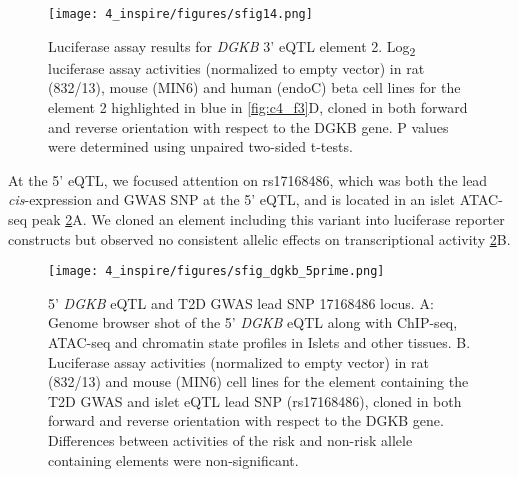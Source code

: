 \begin{figure}
    \centering
    \texttt{[image: 4\_inspire/figures/sfig14.png]}
    \caption[Luciferase assay results for \textit{DGKB} 3' eQTL element 2]{Luciferase assay results for \textit{DGKB} 3' eQTL element 2. Log\textsubscript{2} luciferase assay activities (normalized to empty vector) in rat (832/13), mouse (MIN6) and human (endoC) beta cell lines for the element 2 highlighted in blue in \ref{fig:c4_f3}D, cloned in both forward and reverse orientation with respect to the DGKB gene. P values were determined using unpaired two-sided t-tests.}
    \label{fig:c4_sf14}
\end{figure}
  
At the 5' eQTL, we focused attention on rs17168486, which was both the lead \textit{cis}-expression and GWAS SNP at the 5' eQTL, and is located in an islet ATAC-seq peak  \ref{fig:c4_sf_dgkb_5prime}A. We cloned an element including this variant into luciferase reporter constructs but observed no consistent allelic effects on transcriptional activity \ref{fig:c4_sf_dgkb_5prime}B. 

\begin{figure}
    \centering
    \texttt{[image: 4\_inspire/figures/sfig\_dgkb\_5prime.png]}
    \caption[5' \textit{DGKB} eQTL and T2D GWAS lead SNP 17168486 locus]{5' \textit{DGKB} eQTL and T2D GWAS lead SNP 17168486 locus. A: Genome browser shot of the 5' \textit{DGKB} eQTL along with ChIP-seq, ATAC-seq and chromatin state profiles in Islets and other tissues. B. Luciferase assay activities (normalized to empty vector) in rat (832/13) and mouse (MIN6) cell lines for the element containing the T2D GWAS and islet eQTL lead SNP (rs17168486), cloned in both forward and reverse orientation with respect to the DGKB gene. Differences between activities of the risk and non-risk allele containing elements were non-significant.}
    \label{fig:c4_sf_dgkb_5prime}
\end{figure}

